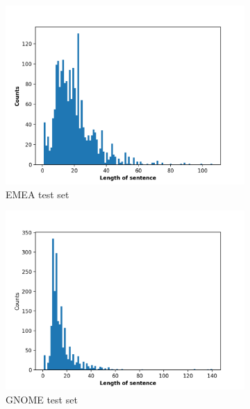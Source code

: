 \begin{figure}[hb!]
\centering
\begin{subfigure}{.32\textwidth}
  \centering
  \includegraphics[width=1\linewidth]{images/EMEA_length.png}
  \caption{EMEA test set}
  \label{fig:sub1}
\end{subfigure}
\begin{subfigure}{.32\textwidth}
  \centering
  \includegraphics[width=1\linewidth]{images/GNOME_length.png}
  \caption{GNOME test set}
  \label{fig:sub1}
\end{subfigure}
\begin{subfigure}{.32\textwidth}
  \centering

\end{subfigure}
\end{figure}
